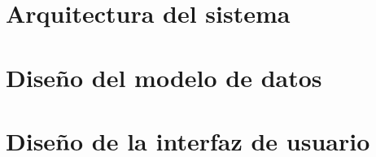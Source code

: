 \section{Arquitectura del sistema}
\label{arquitectura_sistema}



\section{Diseño del modelo de datos}
\label{diseno_modelo_datos}


\section{Diseño de la interfaz de usuario}
\label{diseno_interfaz_usuario}

